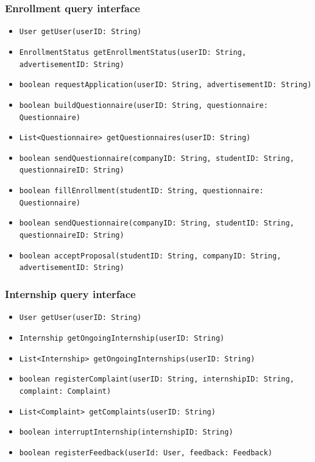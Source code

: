 \subsubsection{Enrollment query interface}
\begin{itemize}
    \item \verb|User getUser(userID: String)|
    \item \verb|EnrollmentStatus getEnrollmentStatus(userID: String, | \\ \makebox[10em][l]{} \verb|advertisementID: String)|
    \item \verb|boolean requestApplication(userID: String, advertisementID: String)|
    \item \verb|boolean buildQuestionnaire(userID: String, questionnaire: Questionnaire)|
    \item \verb|List<Questionnaire> getQuestionnaires(userID: String)|
    \item \verb|boolean sendQuestionnaire(companyID: String, studentID: String, | \\ \makebox[10em][l]{} \verb|questionnaireID: String)|
    \item \verb|boolean fillEnrollment(studentID: String, questionnaire: Questionnaire)|
    \item \verb|boolean sendQuestionnaire(companyID: String, studentID: String, | \\ \makebox[10em][l]{} \verb|questionnaireID: String)|
    \item \verb|boolean acceptProposal(studentID: String, companyID: String, | \\ \makebox[10em][l]{} \verb|advertisementID: String)|
\end{itemize}

\subsubsection{Internship query interface}
\begin{itemize}
    \item \verb|User getUser(userID: String)|
    \item \verb|Internship getOngoingInternship(userID: String)|
    \item \verb|List<Internship> getOngoingInternships(userID: String)|
    \item \verb|boolean registerComplaint(userID: String, internshipID: String, | \\ \makebox[10em][l]{} \verb|complaint: Complaint)|
    \item \verb|List<Complaint> getComplaints(userID: String)|
    \item \verb|boolean interruptInternship(internshipID: String)|
    \item \verb|boolean registerFeedback(userId: User, feedback: Feedback)|
\end{itemize}


